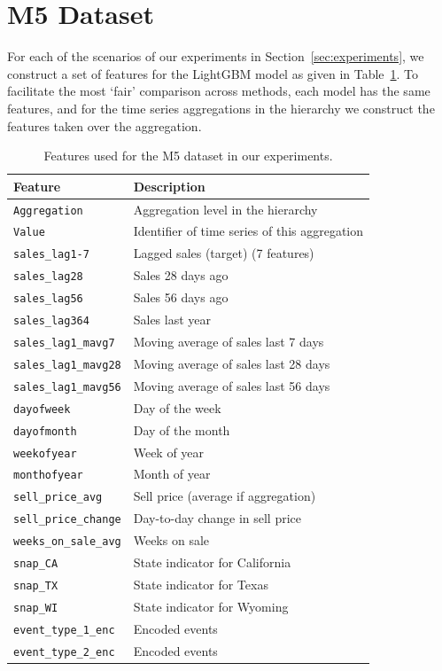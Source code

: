 \documentclass[preprint, 3p, times, twocolumn]{elsarticle}
\begin{document}
\section{M5 Dataset} \label{app:m5dataset}
For each of the scenarios of our experiments in Section~\ref{sec:experiments}, we construct a set of features for the LightGBM model as given in Table~\ref{tab:features}. To facilitate the most `fair' comparison across methods, each model has the same features, and for the time series aggregations in the hierarchy we construct the features taken over the aggregation. 
\begin{table}
  \caption{Features used for the M5 dataset in our experiments.}
  \label{tab:features}
  \begin{center}
  {\small\setlength{\tabcolsep}{1pt} 
  \begin{tabular}{l l }
  \toprule 
  Feature & Description \\
  \midrule
  \texttt{Aggregation} & Aggregation level in the hierarchy \\
  \texttt{Value} & Identifier of time series of this aggregation \\   
  \texttt{sales\_lag1-7} & Lagged sales (target) (7 features) \\
  \texttt{sales\_lag28} & Sales 28 days ago \\ 
  \texttt{sales\_lag56} & Sales 56 days ago \\ 
  \texttt{sales\_lag364} & Sales last year \\ 
  \texttt{sales\_lag1\_mavg7} & Moving average of sales last 7 days \\
  \texttt{sales\_lag1\_mavg28} & Moving average of sales last 28 days \\ 
  \texttt{sales\_lag1\_mavg56} & Moving average of sales last 56 days\\ 
  \texttt{dayofweek} & Day of the week \\ 
  \texttt{dayofmonth} & Day of the month \\
  \texttt{weekofyear} & Week of year \\ 
  \texttt{monthofyear} & Month of year \\ 
  \texttt{sell\_price\_avg} & Sell price (average if aggregation)\\ 
  \texttt{sell\_price\_change} & Day-to-day change in sell price\\
  \texttt{weeks\_on\_sale\_avg} & Weeks on sale \\ 
  \texttt{snap\_CA} & State indicator for California \\ 
  \texttt{snap\_TX} & State indicator for Texas \\ 
  \texttt{snap\_WI} & State indicator for Wyoming \\
  \texttt{event\_type\_1\_enc} & Encoded events \\ 
  \texttt{event\_type\_2\_enc} & Encoded events \\
  \bottomrule
  \end{tabular}}
  \end{center}
\end{table}
\end{document}
